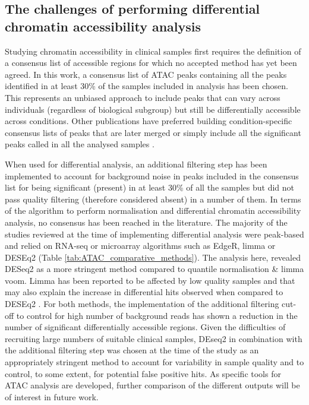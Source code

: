 

\subsection{The challenges of performing differential chromatin accessibility analysis}
Studying chromatin accessibility in clinical samples first requires the definition of a consensus list of accessible regions for which no accepted method has yet been agreed. In this work, a consensus list of ATAC peaks containing all the peaks identified in at least 30\% of the samples included in analysis has been chosen. This represents an unbiased approach to include peaks that can vary across individuals (regardless of biological subgroup) but still be differentially accessible across conditions. Other publications have preferred building condition-specific consensus lists of peaks that are later merged or simply include all the significant peaks called in all the analysed samples \parencite{Alasoo2018, Thurner2018}. 

When used for differential analysis, an additional filtering step has been implemented to account for background noise in peaks included in the consensus list for being significant (present) in at least 30\% of all the samples but did not pass quality filtering (therefore considered absent) in a number of them. In terms of the algorithm to perform normalisation and differential chromatin accessibility analysis, no consensus has been reached in the literature. The majority of the studies reviewed at the time of implementing differential analysis were peak-based and relied on RNA-seq or microarray algorithms such as EdgeR, limma or DESEq2 (Table \ref{tab:ATAC_comparative_methods}). The analysis here, revealed DESeq2 as a more stringent method compared to quantile normalisation \& limma voom. Limma has been reported to be affected by low quality samples and that may also explain the increase in differential hits observed when compared to DESEq2 \parencite{Alasoo2018}. For both methods, the implementation of the additional filtering cut-off to control for high number of background reads has shown a reduction in the number of significant differentially accessible regions. Given the difficulties of recruiting large numbers of suitable clinical samples, DEseq2 in combination with the additional filtering step was chosen at the time of the study as an appropriately stringent method to account for variability in sample quality and to control, to some extent, for potential false positive hits. As specific tools for ATAC analysis are developed, further comparison of the different outputs will be of interest in future work.


